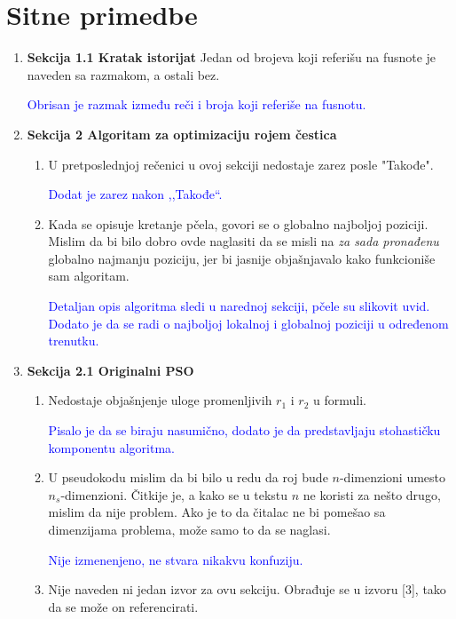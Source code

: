 \documentclass[a4paper]{report}
\newcommand{\odgovor}[1]{\textcolor{blue}{#1}}
\begin{document}
\section{Sitne primedbe}
\begin{enumerate}
    \item \textbf{Sekcija 1.1 Kratak istorijat} Jedan od brojeva koji referišu na fusnote je naveden sa razmakom, a ostali bez.
    
    \odgovor{Obrisan je razmak između reči i broja koji referiše na fusnotu.}
    
    \item \textbf{Sekcija 2 Algoritam za optimizaciju rojem čestica} \begin{enumerate}
        \item U pretposlednjoj rečenici u ovoj sekciji nedostaje zarez posle "Takođe".
        
        \odgovor{Dodat je zarez nakon ,,Takođe``.}
        
        \item Kada se opisuje kretanje pčela, govori se o globalno najboljoj poziciji. Mislim da bi bilo dobro ovde naglasiti da se misli na \textit{za sada pronađenu} globalno najmanju poziciju, jer bi jasnije objašnjavalo kako funkcioniše sam algoritam.
        
        \odgovor{Detaljan opis algoritma sledi u narednoj sekciji, pčele su slikovit uvid. Dodato je da se radi o najboljoj lokalnoj i globalnoj poziciji u određenom trenutku.}
    \end{enumerate}
    
    \item \textbf{Sekcija 2.1 Originalni PSO}
    \begin{enumerate}
        \item Nedostaje objašnjenje uloge promenljivih $r_1$ i $r_2$ u formuli.
        
        \odgovor{Pisalo je da se biraju nasumično, dodato je da predstavljaju stohastičku komponentu algoritma.}
        \item U pseudokodu mislim da bi bilo u redu da roj bude $n$-dimenzioni umesto $n_s$-dimenzioni. Čitkije je, a kako se u tekstu $n$ ne koristi za nešto drugo, mislim da nije problem. Ako je to da čitalac ne bi pomešao sa dimenzijama problema, može samo to da se naglasi.
        
        
        \odgovor{Nije izmenenjeno, ne stvara nikakvu konfuziju.}
        \item Nije naveden ni jedan izvor za ovu sekciju. Obrađuje se u izvoru [3], tako da se može on referencirati.
        

\end{enumerate}
\end{enumerate}
\end{document}
